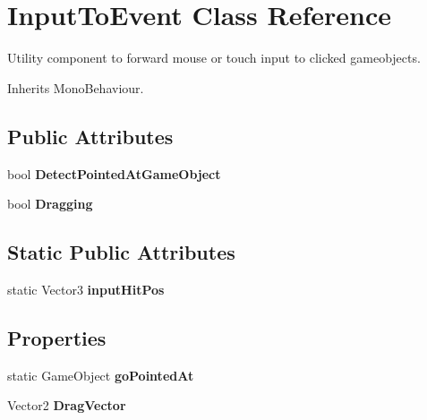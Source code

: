 \hypertarget{class_input_to_event}{}\section{Input\+To\+Event Class Reference}
\label{class_input_to_event}


Utility component to forward mouse or touch input to clicked gameobjects.  




Inherits Mono\+Behaviour.

\subsection*{Public Attributes}
\begin{DoxyCompactItemize}
\item 
bool {\bfseries Detect\+Pointed\+At\+Game\+Object}\hypertarget{class_input_to_event_ae4f958f81632ea46ce83ef9ae8801b69}{}\label{class_input_to_event_ae4f958f81632ea46ce83ef9ae8801b69}

\item 
bool {\bfseries Dragging}\hypertarget{class_input_to_event_a7962fc265dae0897c0d703a4ddabf466}{}\label{class_input_to_event_a7962fc265dae0897c0d703a4ddabf466}

\end{DoxyCompactItemize}
\subsection*{Static Public Attributes}
\begin{DoxyCompactItemize}
\item 
static Vector3 {\bfseries input\+Hit\+Pos}\hypertarget{class_input_to_event_afed01280ab0eb13db78bf20e6ddc8110}{}\label{class_input_to_event_afed01280ab0eb13db78bf20e6ddc8110}

\end{DoxyCompactItemize}
\subsection*{Properties}
\begin{DoxyCompactItemize}
\item 
static Game\+Object {\bfseries go\+Pointed\+At}\hypertarget{class_input_to_event_a174f9bb241e6abae04030a747fc50a51}{}\label{class_input_to_event_a174f9bb241e6abae04030a747fc50a51}

\item 
Vector2 {\bfseries Drag\+Vector}\hypertarget{class_input_to_event_a7a515661f0f9d2367a0e603cbed88592}{}\label{class_input_to_event_a7a515661f0f9d2367a0e603cbed88592}

\end{DoxyCompactItemize}


